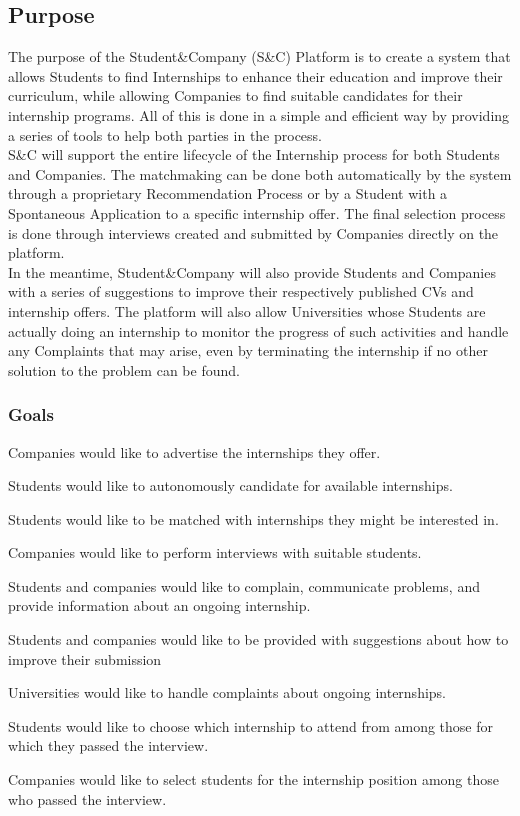 \subsection{Purpose}
The purpose of the Student\&Company (S\&C) Platform is to create a system that allows Students to find Internships to enhance their education and improve their curriculum, while allowing Companies to find suitable candidates for their internship programs. All of this is done in a simple and efficient way by providing a series of tools to help both parties in the process.\\
S\&C will support the entire lifecycle of the Internship process for both Students and Companies. The matchmaking can be done both  automatically by the system through a proprietary Recommendation Process or by a Student with a Spontaneous Application to a specific internship offer. The final selection process is done through interviews created and submitted by Companies directly on the platform.\\
In the meantime, Student\&Company will also provide Students and Companies with a series of suggestions to improve their respectively published CVs and internship offers. The platform will also allow Universities whose Students are actually doing an internship to monitor the progress of such activities and handle any Complaints that may arise, even by terminating the internship if no other solution to the problem can be found.
\subsubsection{Goals}
\begin{enumerate}[label={\color{titleColor}[G\arabic*]}]
\item Companies would like to advertise the internships they offer.
\item Students would like to autonomously candidate for available internships.
\item Students would like to be matched with internships they might be interested in.
\item Companies would like to perform interviews with suitable students.
\item Students and companies would like to complain, communicate problems, and provide information about an ongoing internship.
\item Students and companies would like to be provided with suggestions about how to improve their submission
\item Universities would like to handle complaints about ongoing internships.
\item Students would like to choose which internship to attend from among those for which they passed the interview.
\item Companies would like to select students for the internship position among those who passed the interview.
\end{enumerate}



